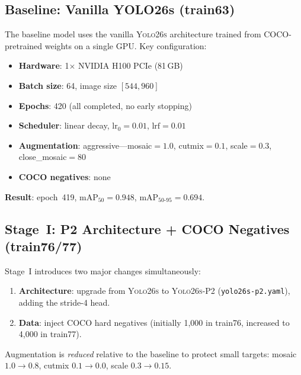 \documentclass[11pt, a4paper]{article}
\newcommand{\mapfifty}{\text{mAP}_{50}}
\newcommand{\mapfull}{\text{mAP}_{50\text{-}95}}
\newcommand{\yolobase}{\textsc{Yolo26s}}
\newcommand{\yolop}{\textsc{Yolo26s-P2}}
\begin{document}
\subsection{Baseline: Vanilla YOLO26s (train63)}
\label{sec:baseline}

The baseline model uses the vanilla \yolobase{} architecture trained from
COCO-pretrained weights on a single GPU. Key configuration:

\begin{itemize}[leftmargin=*, itemsep=2pt]
  \item \textbf{Hardware}: 1$\times$ NVIDIA H100 PCIe (81\,GB)
  \item \textbf{Batch size}: 64, image size $[544, 960]$
  \item \textbf{Epochs}: 420 (all completed, no early stopping)
  \item \textbf{Scheduler}: linear decay, $\text{lr}_0 = 0.01$,
        $\text{lrf} = 0.01$
  \item \textbf{Augmentation}: aggressive---mosaic$=1.0$,
        cutmix$=0.1$, scale$=0.3$, close\_mosaic$=80$
  \item \textbf{COCO negatives}: none
\end{itemize}

\noindent\textbf{Result}: epoch~419, $\mapfifty = 0.948$,
$\mapfull = 0.694$.

\subsection{Stage~I: P2 Architecture + COCO Negatives (train76/77)}
\label{sec:stage1}

Stage~I introduces two major changes simultaneously:

\begin{enumerate}[leftmargin=*]
  \item \textbf{Architecture}: upgrade from \yolobase{} to \yolop{}
        (\texttt{yolo26s-p2.yaml}), adding the stride-4 head.
  \item \textbf{Data}: inject COCO hard negatives (initially 1{,}000
        in train76, increased to 4{,}000 in train77).
\end{enumerate}

\noindent Augmentation is \emph{reduced} relative to the baseline to
protect small targets: mosaic $1.0 \to 0.8$, cutmix
$0.1 \to 0.0$, scale $0.3 \to 0.15$.
\end{document}
